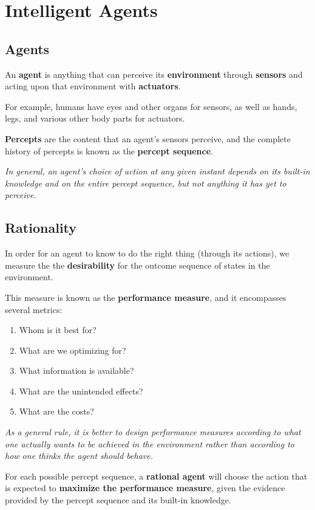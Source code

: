 \section{Intelligent Agents}


\subsection{Agents}

An \textbf{agent} is anything that can perceive its \textbf{environment} through \textbf{sensors} and acting upon that environment with \textbf{actuators}.

For example, humans have eyes and other organs for sensors, as well as hands, legs, and various other body parts for actuators.

\textbf{Percepts} are the content that an agent's sensors perceive, and the complete history of percepts is known as the \textbf{percept sequence}.

\emph{In general, an agent's choice of action at any given instant depends on its built-in knowledge and on the entire percept sequence, but not anything it has yet to perceive.}


\subsection{Rationality}

In order for an agent to know to do the right thing (through its actions),
we measure the the \textbf{desirability} for the outcome sequence of states in the environment.

This measure is known as the \textbf{performance measure}, and it encompasses several metrics:

\begin{enumerate}
    \item Whom is it best for?
    \item What are we optimizing for?
    \item What information is available?
    \item What are the unintended effects?
    \item What are the costs?
\end{enumerate}

\emph{As a general rule, it is better to design performance measures according to what one actually wants to be achieved in the environment rather than according to how one thinks the agent should behave.}

For each possible percept sequence, a \textbf{rational agent} will choose the action that is expected to \textbf{maximize the performance measure}, given the evidence provided by the percept sequence and its built-in knowledge.


